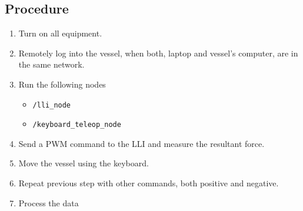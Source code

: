 \subsection*{Procedure}
\begin{enumerate}
	\item Turn on all equipment.
    \item Remotely log into the vessel, when both, laptop and vessel's computer, are in the same network.
	\item Run the following nodes
		\begin{itemize}
			\item \lstinline[style=cinline]{/lli_node}
			\item \lstinline[style=cinline]{/keyboard_teleop_node}
		\end{itemize}
    \item Send a PWM command to the LLI and measure the resultant force.
	\item Move the vessel using the keyboard.
    \item Repeat previous step with other commands, both positive and negative.
    \item Process the data
\end{enumerate}


